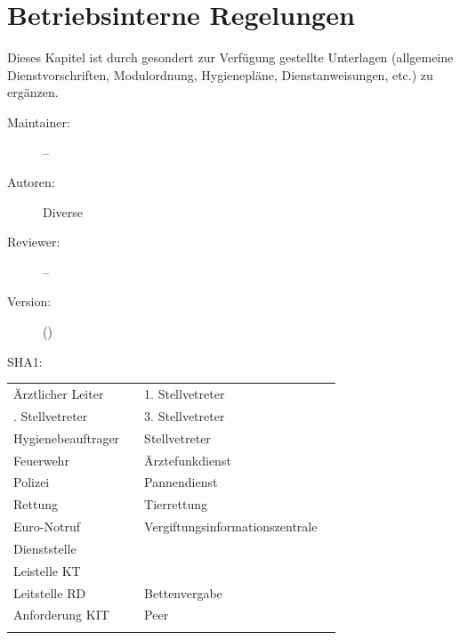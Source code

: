 \def\ChapterCode{BET}
\chapter
[Betriebsinterne Regelungen]
{Betriebsinterne Regelungen}
\label{chp:BET}

\ChapterIntro
{%
Dieses Kapitel ist durch gesondert zur Verfügung gestellte
Unterlagen (allgemeine Dienstvorschriften, Modulordnung,
Hygienepläne, Dienstanweisungen, etc.) zu ergänzen.
}
{%
\begin{description}
  \item[Maintainer:] --
  \item[Autoren:] Diverse
  \item[Reviewer:] --
  \item[Version:] {\DocVersion} ({\DocVersionInfo})
  \item[SHA1:] {\DocGitCommit}
\end{description}

{\TxTeilkapitelAASS}
}



\begin{table}[H]
\FormatTable\large
\begin{WidePar}
\begin{tabularx}{\linewidth}{XXXX}
\toprule\addlinespace
Ärztlicher Leiter &  & 1. Stellvetreter
\\\hhline{~-~-}\addlinespace
2. Stellvetreter &   & 3. Stellvetreter
\\\hhline{~-~-}\addlinespace
Hygienebeauftrager &  & Stellvetreter
\\\addlinespace\midrule\addlinespace
Feuerwehr	&  & Ärztefunkdienst 	&  
\\\hhline{~-~-}\addlinespace
Polizei		&  & Pannendienst		&  
\\\hhline{~-~-}\addlinespace
Rettung		&  & Tierrettung			&  
\\\hhline{~-~-}\addlinespace
Euro-Notruf &  & Vergiftungs\-informations\-zentrale &   
\\\hhline{~-~-}\addlinespace
Dienststelle &  &  & 
\\\hhline{~-~-}\addlinespace
Leistelle KT &  & & 
\\\hhline{~-~-}\addlinespace
Leitstelle RD &  & Bettenvergabe & 
\\\hhline{~-~-}\addlinespace
Anforderung KIT &  & Peer
\\\hhline{~-~-}\addlinespace\bottomrule
\end{tabularx}
\end{WidePar}
\end{table}

\ChapterEnd